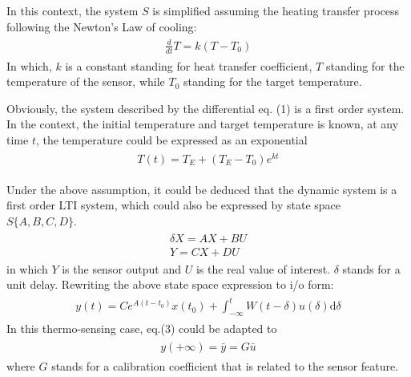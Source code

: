 \documentclass[journal]{IEEEtran}
\begin{document}
In this context, the system $S$ is simplified assuming the heating transfer process following the Newton's Law of cooling:
\begin{align} 
	\begin{split}
		\frac{d}{dt}T = k(T-T_0)
	\end{split}
\end{align}
In which, $k$ is a constant standing for heat transfer coefficient, $T$ standing for the temperature of the sensor, while $T_0$ standing for the target temperature.

Obviously, the system described by the differential eq. (1) is a first order system. In the context, the initial temperature and target temperature is known, at any time $t$, the temperature could be expressed as an exponential
\begin{align} 
	\begin{split}
		T(t) = T_E+(T_E-T_0)e^{kt}
	\end{split}
\end{align}

Under the above assumption, it could be deduced that the dynamic system is a first order LTI system, which could also be expressed by state space $S\{A,B,C,D\}$.
\begin{align*} 
	\begin{split}
		\delta X = AX+BU \\
		Y = CX+DU
	\end{split}
\end{align*} in which $Y$ is the sensor output and $U$ is the real value of interest. $\delta$ stands for a unit delay. Rewriting the above state space expression to i/o form: 
\begin{align} 
	\begin{split}
		y(t) = Ce^{A(t-t_0)}x(t_0)+\int_{-\infty}^t W(t-\delta)u(\delta)\mathrm{d}\delta
	\end{split}
\end{align}
In this thermo-sensing case, eq.(3) could be adapted to
\begin{align} 
	\begin{split}
		y(+\infty) = \bar{y} = G\bar{u}
	\end{split}
\end{align} where $G$ stands for a calibration coefficient that is related to the sensor feature. 

\end{document}
